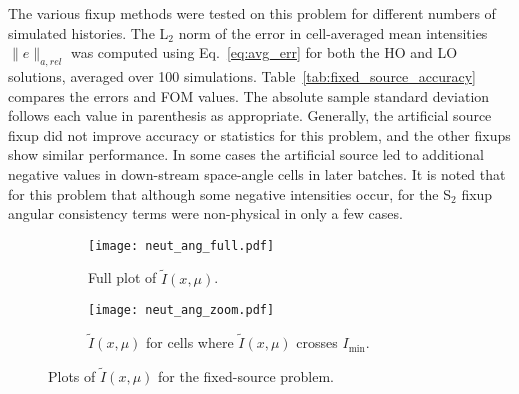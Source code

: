 The various fixup methods were tested on this problem for different numbers of simulated histories.  The L$_2$
norm of the error in cell-averaged mean intensities $\|e\|_{a,rel}$ was computed using
Eq.~\eqref{eq:avg_err} for both the HO and LO solutions, averaged over 100
simulations.  Table~\ref{tab:fixed_source_accuracy} compares the errors and FOM values. 
The absolute sample standard deviation follows each value in parenthesis 
as appropriate.  Generally, the artificial source fixup did not improve accuracy or
statistics for this problem, and the other fixups show similar performance.
In some cases
the artificial source led to additional negative values in down-stream space-angle cells in later
batches.  It is noted that for
this problem that although some negative intensities occur, for the S$_2$ fixup angular consistency terms
were non-physical in only a few cases.  
\begin{figure}[hp]
    \centering
\begin{subfigure}{0.7\textwidth}
  \centering
    \texttt{[image: neut\_ang\_full.pdf]}
    \caption{\label{fig:neut_ang_full} Full plot of $\tilde I(x,\mu)$.}
\end{subfigure}
\begin{subfigure}{0.7\textwidth}
  \centering
  \texttt{[image: neut\_ang\_zoom.pdf]}
  \caption{\label{fig:neut_ang_zoom} $\tilde I(x,\mu)$ for cells where $\tilde I(x,\mu)$
  crosses $I_{\min}$.   }
\end{subfigure}
\caption{Plots of $\tilde I(x,\mu)$ for the fixed-source problem.}
\end{figure}
